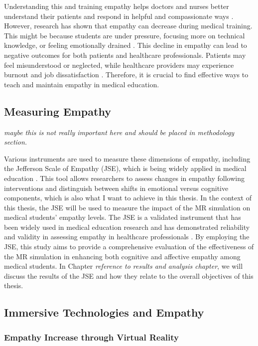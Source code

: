 Understanding this and training empathy helps doctors and nurses better understand their patients and respond in helpful and compassionate ways \cite{Ozcan2018, Olson1995}. However, research has shown that empathy can decrease during medical training. This might be because students are under pressure, focusing more on technical knowledge, or feeling emotionally drained \cite{Mattsson2024, Ozcan2018}. This decline in empathy can lead to negative outcomes for both patients and healthcare professionals. Patients may feel misunderstood or neglected, while healthcare providers may experience burnout and job dissatisfaction \cite{Mattsson2024, Cunico2012}. Therefore, it is crucial to find effective ways to teach and maintain empathy in medical education.

\subsection{Measuring Empathy}
\emph{maybe this is not really important here and should be placed in methodology section.}

Various instruments are used to measure these dimensions of empathy, including the Jefferson Scale of Empathy (JSE), which is being widely applied in medical education \cite{Alieldin2024}. This tool allows researchers to assess changes in empathy following interventions and distinguish between shifts in emotional versus cognitive components, which is also what I want to achieve in this thesis. In the context of this thesis, the JSE will be used to measure the impact of the MR simulation on medical students' empathy levels. The JSE is a validated instrument that has been widely used in medical education research and has demonstrated reliability and validity in assessing empathy in healthcare professionals \cite{Hojat2002}. By employing the JSE, this study aims to provide a comprehensive evaluation of the effectiveness of the MR simulation in enhancing both cognitive and affective empathy among medical students. In Chapter \emph{reference to results and analysis chapter}, we will discuss the results of the JSE and how they relate to the overall objectives of this thesis.

\subsection{Immersive Technologies and Empathy}

\subsubsection{Empathy Increase through Virtual Reality}


